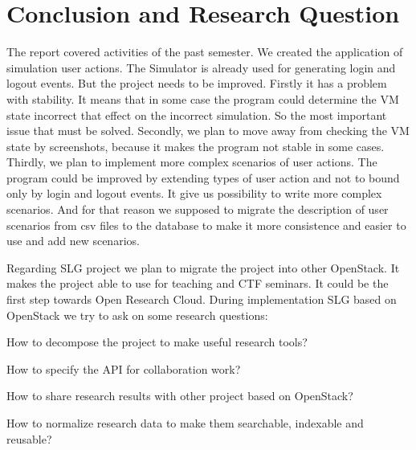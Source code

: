 \section{Conclusion and Research Question}

The report covered activities of the past semester. We created the application of simulation user actions. The Simulator is already used for generating login and logout events. But the project needs to be improved. Firstly it has a problem with stability. It means that in some case the program could determine the VM state incorrect that effect on the incorrect simulation. So the most important issue that must be solved. Secondly, we plan to move away from checking the VM state by screenshots, because it makes the program not stable in some cases. Thirdly, we plan to implement more complex scenarios of user actions. The program could be improved by extending types of user action and not to bound only by login and logout events. It give us possibility to write more complex scenarios. And for that reason we supposed to migrate the description of user scenarios from csv files to the database to make it more consistence and easier to use and add new scenarios.    

Regarding SLG project we plan to migrate the project into other OpenStack. It makes the project able to use for teaching and CTF seminars. It could be the first step towards Open Research Cloud. During implementation SLG based on OpenStack we try to ask on some research questions: 
\begin{compactitem}
\item How to decompose the project to make useful research tools?
\item How to specify the API for collaboration work?
\item How to share research results with other project based on OpenStack?
\item How to normalize research data to make them searchable, indexable and reusable?  
\end{compactitem}